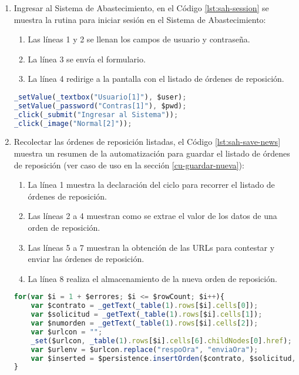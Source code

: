 \begin{enumerate}
	\item Ingresar al Sistema de Abastecimiento, en el Código \ref{lst:sah-session} se muestra la rutina para iniciar sesión en el Sistema de Abastecimiento:
	\begin{enumerate}
		\item Las líneas 1 y 2 se llenan los campos de usuario y contraseña.
		\item La línea 3 se envía el formulario.
		\item La línea 4 redirige a la pantalla con el listado de órdenes de reposición.  
	\end{enumerate}
	\begin{lstlisting}[language=Javascript, caption={Inicio de sesión en el Sistema de Abastecimiento.}, captionpos=b, label={lst:sah-session}]
_setValue(_textbox("Usuario[1]"), $user);
_setValue(_password("Contras[1]"), $pwd);
_click(_submit("Ingresar al Sistema"));
_click(_image("Normal[2]"));
	\end{lstlisting}

	\item Recolectar las órdenes de reposición listadas, el Código \ref{lst:sah-save-news} muestra un resumen de la automatización para guardar el listado de órdenes de reposición (ver caso de uso en la sección \ref{cu-guardar-nueva}):
	\begin{enumerate}
		\item La línea 1 muestra la declaración del ciclo para recorrer el listado de órdenes de reposición.
		\item Las líneas 2 a 4 muestran como se extrae el valor de los datos de una orden de reposición.
		\item Las líneas 5 a 7 muestran la obtención de las URLs para contestar y enviar las órdenes de reposición.
		\item La línea 8 realiza el almacenamiento de la nueva orden de reposición. 
	\end{enumerate}
	\begin{lstlisting}[language=Javascript, caption={Guardar lista de órdenes de reposición.}, captionpos=b, label={lst:sah-save-news}]
for(var $i = 1 + $errores; $i <= $rowCount; $i++){
	var $contrato = _getText(_table(1).rows[$i].cells[0]);
	var $solicitud = _getText(_table(1).rows[$i].cells[1]);
	var $numorden = _getText(_table(1).rows[$i].cells[2]);
	var $urlcon = "";
	_set($urlcon, _table(1).rows[$i].cells[6].childNodes[0].href);
	var $urlenv = $urlcon.replace("respoOra", "enviaOra");
	var $inserted = $persistence.insertOrden($contrato, $solicitud, $numorden, $expedicion, $almacen, $urlcon, $urlenv, $idSesion);
}
	\end{lstlisting}


\end{enumerate}
